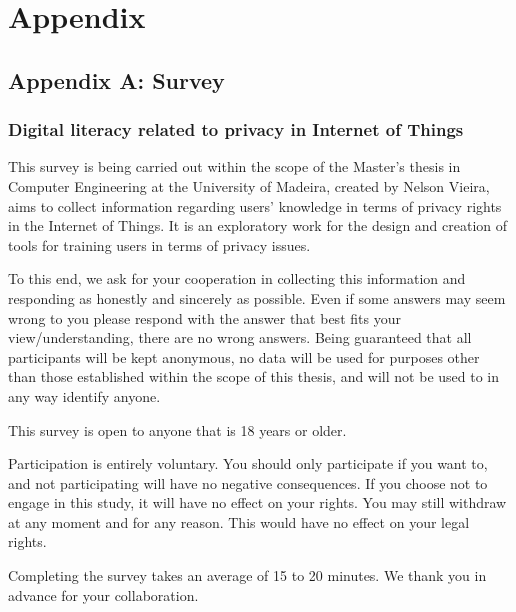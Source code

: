 %
%
\chapter*{Appendix}

\section*{Appendix A: Survey}\label{appendix:survey}

\subsection*{Digital literacy related to privacy in Internet of Things}

This survey is being carried out within the scope of the Master's thesis in
Computer Engineering at the University of Madeira, created by Nelson Vieira,
aims to collect information regarding users' knowledge in terms of privacy rights
in the Internet of Things. It is an exploratory work for the design and creation
of tools for training users in terms of privacy issues.

To this end, we ask for your cooperation in collecting this information and
responding as honestly and sincerely as possible. Even if some answers may
seem wrong to you please respond with the answer that best fits your view/understanding,
there are no wrong answers. Being guaranteed that all participants will be kept
anonymous, no data will be used for purposes other than those established within
the scope of this thesis, and will not be used to in any way identify anyone.

This survey is open to anyone that is 18 years or older.

Participation is entirely voluntary. You should only participate if you want
to, and not participating will have no negative consequences. If you choose
not to engage in this study, it will have no effect on your rights. You may
still withdraw at any moment and for any reason. This would have no effect
on your legal rights.

Completing the  survey takes an average of 15 to 20 minutes. We thank you in
advance for your collaboration.

